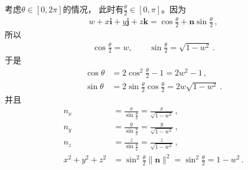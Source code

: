 \begin{prove}
    考虑$\theta\in[0,2\pi]$的情况，
    此时有$\displaystyle\frac{\theta}{2}\in[0,\pi]$。因为
    \begin{align}
        w+x\mathbf{i}+y\mathbf{j}+z\mathbf{k}=\cos\frac{\theta}{2}+\bm n\sin\frac{\theta}{2}\, ,
    \end{align}
    所以
    \begin{align}
        \cos\frac{\theta}{2}=w,\qquad\sin\frac{\theta}{2}=\sqrt{1-w^2}\, .
    \end{align}
    于是
    \begin{align}
        \cos\theta & =2\cos^2\frac{\theta}{2}-1=2w^2-1\, ,                         \\
        \sin\theta & =2\sin\frac{\theta}{2}\cos\frac{\theta}{2}=2w\sqrt{1-w^2}\, .
    \end{align}
    并且
    \begin{align}
        n_x         & =\frac{x}{\sin\frac{\theta}{2}}=\frac{x}{\sqrt{1-w^2}}\, ,          \\
        n_y         & =\frac{y}{\sin\frac{\theta}{2}}=\frac{y}{\sqrt{1-w^2}}\, ,          \\
        n_z         & =\frac{z}{\sin\frac{\theta}{2}}=\frac{z}{\sqrt{1-w^2}}\, ,          \\
        x^2+y^2+z^2 & =\sin^2\frac{\theta}{2}\|\bm n\|^2=\sin^2\frac{\theta}{2}=1-w^2\, .
    \end{align}


\end{prove}
